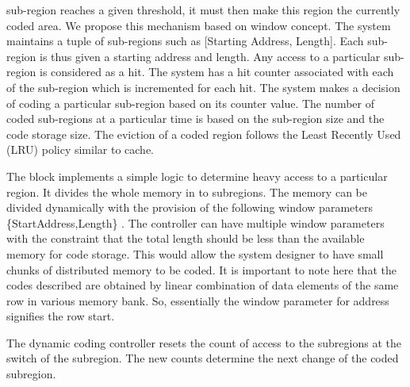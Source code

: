 sub-region reaches a given threshold, it must then make this region the 
currently coded area. We propose this mechanism based on window concept. The 
system maintains a tuple of sub-regions such as [Starting Address, Length]. Each 
sub-region is thus given a starting address and length. Any access to a 
particular sub-region is considered as a hit. The system has a hit counter 
associated with each of the sub-region which is incremented for each hit. The 
system makes a decision of coding a particular sub-region based on its counter 
value. The number of coded sub-regions at a particular time is based on the 
sub-region size and the code storage size. The eviction of a coded region 
follows the Least Recently Used (LRU) policy similar to cache.

The block implements a simple logic to determine heavy access to a particular 
region. It divides the whole memory in to subregions. The memory can be 
divided dynamically with the provision of the following window parameters 
\{StartAddress,Length\} . The controller can have multiple window parameters 
with the constraint that the total length should be less than the available 
memory for code storage. This would allow the system designer to have small 
chunks of distributed memory to be coded. It is important to note here that the 
codes described are obtained by linear combination of data elements of the same 
row in various memory bank. So, essentially the window parameter for address 
signifies the row start.

The dynamic coding controller resets the count of access to the subregions at 
the switch of the subregion. The new counts determine the next change of the 
coded subregion.

